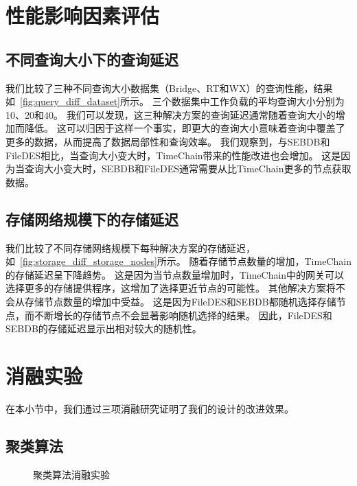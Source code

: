 \section{性能影响因素评估}
\subsection{不同查询大小下的查询延迟}
我们比较了三种不同查询大小数据集（Bridge、RT和WX）的查询性能，结果如~\autoref{fig:query_diff_dataset}所示。
三个数据集中工作负载的平均查询大小分别为10、20和40。
我们可以发现，这三种解决方案的查询延迟通常随着查询大小的增加而降低。
这可以归因于这样一个事实，即更大的查询大小意味着查询中覆盖了更多的数据，从而提高了数据局部性和查询效率。
我们观察到，与SEBDB和FileDES相比，当查询大小变大时，TimeChain带来的性能改进也会增加。
这是因为当查询大小变大时，SEBDB和FileDES通常需要从比TimeChain更多的节点获取数据。

\subsection{存储网络规模下的存储延迟}
我们比较了不同存储网络规模下每种解决方案的存储延迟，如~\autoref{fig:storage_diff_storage_nodes}所示。
随着存储节点数量的增加，TimeChain的存储延迟呈下降趋势。
这是因为当节点数量增加时，TimeChain中的网关可以选择更多的存储提供程序，这增加了选择更近节点的可能性。
其他解决方案将不会从存储节点数量的增加中受益。
这是因为FileDES和SEBDB都随机选择存储节点，而不断增长的存储节点不会显著影响随机选择的结果。
因此，FileDES和SEBDB的存储延迟显示出相对较大的随机性。

\section{消融实验}
在本小节中，我们通过三项消融研究证明了我们的设计的改进效果。

\subsection{聚类算法}
\begin{figure*}[t]
    \centering
	\begin{minipage}{0.96\linewidth}
        \caption{聚类算法消融实验} 
    \end{minipage}
\end{figure*}

